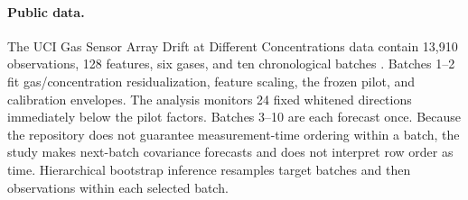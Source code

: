 \paragraph{Public data.}
The UCI Gas Sensor Array Drift at Different Concentrations data contain 13,910 observations, 128 features, six gases, and ten chronological batches \citep{vergara2013uci,vergara2012drift,fonollosa2015dataset}.  Batches 1--2 fit gas/concentration residualization, feature scaling, the frozen pilot, and calibration envelopes.  The analysis monitors 24 fixed whitened directions immediately below the pilot factors.  Batches 3--10 are each forecast once.  Because the repository does not guarantee measurement-time ordering within a batch, the study makes next-batch covariance forecasts and does not interpret row order as time.  Hierarchical bootstrap inference resamples target batches and then observations within each selected batch.
